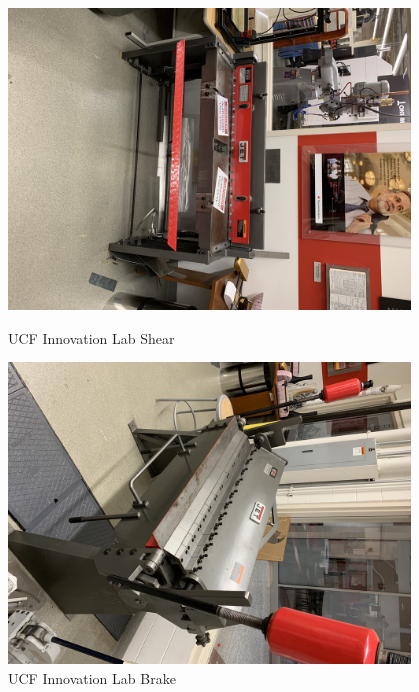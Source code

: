 \begin{figure}[ht]
\centering
\begin{minipage}[b]{.48\textwidth}
  \centering
  \includegraphics[width=0.95\textwidth]{Meetings/November/11-01-21/11-1-21_Hardware_Figure3 - Nathan Forrer.JPG}
  \caption{UCF Innovation Lab Shear}
  \label{fig:110121_6}
\end{minipage}%
\hfill%
\begin{minipage}[b]{.48\textwidth}
  \centering
  \includegraphics[width=0.95\textwidth]{Meetings/November/11-01-21/11-1-21_Hardware_Figure4 - Nathan Forrer.JPG}
  \caption{UCF Innovation Lab Brake}
  \label{fig:110121_7}
\end{minipage}
\end{figure}

